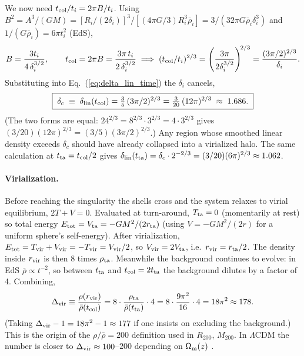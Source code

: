 \documentclass[12pt]{article}
\newcommand{\Omm}{\Omega_{\rm m}}
\begin{document}
We now need $t_{\rm col}/t_i = 2\pi B/t_i$.  Using
$B^2 = A^3/(GM) = [R_i/(2\delta_i)]^3/[(4\pi G/3)R_i^3\bar\rho_i]
= 3/(32\pi G\bar\rho_i \delta_i^3)$ and
$1/(G\bar\rho_i) = 6\pi t_i^2$ (EdS),
%
\begin{equation}
  B = \frac{3t_i}{4\,\delta_i^{3/2}},
  \qquad
  t_{\rm col} = 2\pi B = \frac{3\pi\,t_i}{2\,\delta_i^{3/2}}
  \;\Longrightarrow\;
  (t_{\rm col}/t_i)^{2/3} = \left(\frac{3\pi}{2\delta_i^{3/2}}\right)^{\!2/3}
  = \frac{(3\pi/2)^{2/3}}{\delta_i}.
\end{equation}
%
Substituting into Eq.~(\ref{eq:delta_lin_time}) the $\delta_i$ cancels,
%
\begin{equation}
  \boxed{\;
    \delta_c \;\equiv\; \delta_{\rm lin}(t_{\rm col})
    = \tfrac{3}{5}\,(3\pi/2)^{2/3}
    = \tfrac{3}{20}\,(12\pi)^{2/3}
    \;\approx\; 1.686.
  \;}
  \label{eq:deltac}
\end{equation}
%
(The two forms are equal: $24^{2/3} = 8^{2/3}\cdot 3^{2/3}
= 4\cdot 3^{2/3}$ gives $(3/20)(12\pi)^{2/3} = (3/5)(3\pi/2)^{2/3}$.)
Any region whose smoothed linear density exceeds $\delta_c$ should
have already collapsed into a virialized halo.  The same calculation
at $t_{\rm ta}=t_{\rm col}/2$ gives
$\delta_{\rm lin}(t_{\rm ta}) = \delta_c\cdot 2^{-2/3}
= (3/20)(6\pi)^{2/3} \approx 1.062$.

\paragraph{Virialization.}  Before reaching the singularity the
shells cross and the system relaxes to virial equilibrium,
$2T + V = 0$.  Evaluated at turn-around, $T_{\rm ta}=0$ (momentarily
at rest) so total energy $E_{\rm tot} = V_{\rm ta} = -GM^2/(2r_{\rm ta})$
(using $V = -GM^2/(2r)$ for a uniform sphere's self-energy).  After
virialization, $E_{\rm tot} = T_{\rm vir}+V_{\rm vir} = -T_{\rm vir}
= V_{\rm vir}/2$, so $V_{\rm vir} = 2V_{\rm ta}$, i.e.\
$r_{\rm vir} = r_{\rm ta}/2$.  The density inside $r_{\rm vir}$
is then $8$ times $\rho_{\rm ta}$.  Meanwhile the background
continues to evolve: in EdS $\bar\rho \propto t^{-2}$, so between
$t_{\rm ta}$ and $t_{\rm col}=2t_{\rm ta}$ the background dilutes by
a factor of 4.  Combining,
%
\begin{equation}
  \Delta_{\rm vir}\equiv
  \frac{\rho(r_{\rm vir})}{\bar\rho(t_{\rm col})}
  = 8\cdot\frac{\rho_{\rm ta}}{\bar\rho(t_{\rm ta})}\cdot 4
  = 8\cdot\frac{9\pi^2}{16}\cdot 4
  = 18\pi^2 \approx 178.
  \label{eq:Delta_vir}
\end{equation}
%
(Taking $\Delta_{\rm vir}-1 = 18\pi^2-1 \approx 177$ if one insists on
excluding the background.)  This is the origin of the
$\rho/\bar\rho=200$ definition used in $R_{200}$, $M_{200}$.  In
$\Lambda$CDM the number is closer to $\Delta_{\rm vir}\approx
100$--$200$ depending on $\Omm(z)$ \citep{Bryan1998}.
\end{document}
